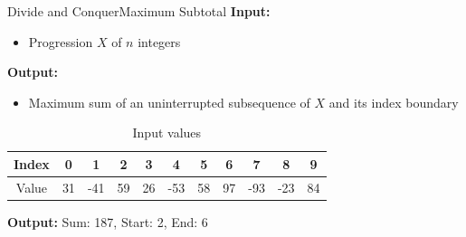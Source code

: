 \begin{frame}{Divide and Conquer}{Maximum Subtotal}
  \textbf{Input:}
  \begin{itemize}
    \item
      Progression {\color{Mittel-Blau}$X$} of {\color{Mittel-Blau}$n$} integers
  \end{itemize}
  \textbf{Output:}
  \begin{itemize}
    \item
      Maximum sum of an uninterrupted subsequence of {\color{Mittel-Blau}$X$} and its index boundary
  \end{itemize}
  \vspace{-1em}
    \begin{table}[!t]
      \caption{Input values}
      \begin{tabular}{c|c|c|c|c|c|c|c|c|c|c}
        Index & 0 & 1 & 2 & 3 & 4 & 5 & 6 & 7 & 8 & 9\\
        \midrule
        Value & 31 & -41 & 59 & 26 & -53 & 58 & 97 & -93 & -23 & 84
      \end{tabular}
      \label{tab:divide_and_conquer:max_subtotal_example_values}
    \end{table}
    \vspace{1em}
    \textbf{Output:} Sum: 187, Start: 2, End: 6
\end{frame}



